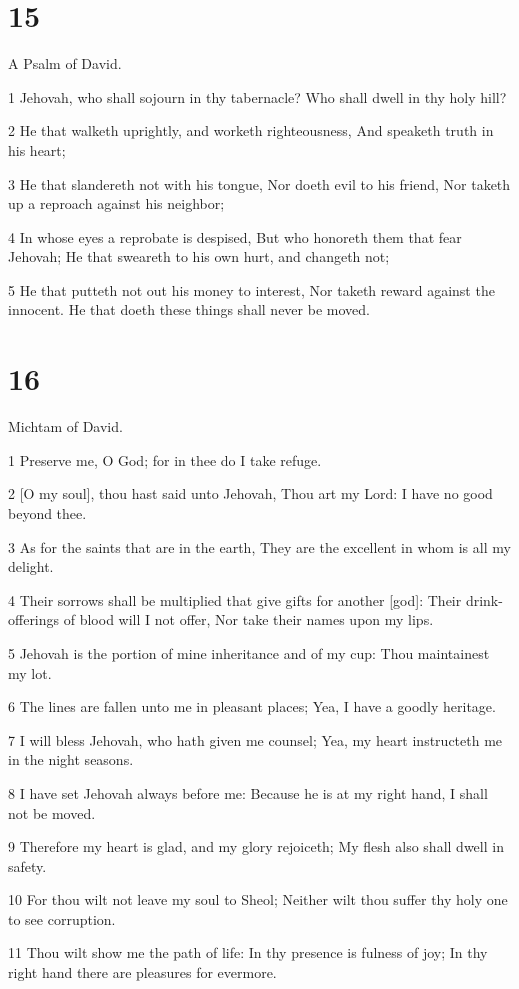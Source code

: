\chapter{15}

\par A Psalm of David.

\par 1 Jehovah, who shall sojourn in thy tabernacle? Who shall dwell in thy holy hill?
\par 2 He that walketh uprightly, and worketh righteousness, And speaketh truth in his heart;
\par 3 He that slandereth not with his tongue, Nor doeth evil to his friend, Nor taketh up a reproach against his neighbor;
\par 4 In whose eyes a reprobate is despised, But who honoreth them that fear Jehovah; He that sweareth to his own hurt, and changeth not;
\par 5 He that putteth not out his money to interest, Nor taketh reward against the innocent. He that doeth these things shall never be moved.

\chapter{16}

\par Michtam of David.

\par 1 Preserve me, O God; for in thee do I take refuge.
\par 2 [O my soul], thou hast said unto Jehovah, Thou art my Lord: I have no good beyond thee.
\par 3 As for the saints that are in the earth, They are the excellent in whom is all my delight.
\par 4 Their sorrows shall be multiplied that give gifts for another [god]: Their drink-offerings of blood will I not offer, Nor take their names upon my lips.
\par 5 Jehovah is the portion of mine inheritance and of my cup: Thou maintainest my lot.
\par 6 The lines are fallen unto me in pleasant places; Yea, I have a goodly heritage.
\par 7 I will bless Jehovah, who hath given me counsel; Yea, my heart instructeth me in the night seasons.
\par 8 I have set Jehovah always before me: Because he is at my right hand, I shall not be moved.
\par 9 Therefore my heart is glad, and my glory rejoiceth; My flesh also shall dwell in safety.
\par 10 For thou wilt not leave my soul to Sheol; Neither wilt thou suffer thy holy one to see corruption.
\par 11 Thou wilt show me the path of life: In thy presence is fulness of joy; In thy right hand there are pleasures for evermore.

